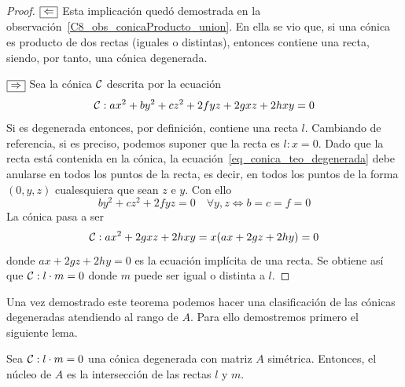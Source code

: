 \begin{proof}
	$\fbox{$\Leftarrow$}$ Esta implicación quedó demostrada en la observación~\ref{C8_obs_conicaProducto_union}. En ella se vio que, si una cónica es producto de dos rectas (iguales o distintas), entonces contiene una recta, siendo, por tanto, una cónica degenerada.
	
	$\fbox{$\Rightarrow$}$ Sea la cónica $\mathcal{C}$ descrita por la ecuación
	\begin{equation}\label{eq_conica_teo_degenerada}
	\mathcal{C}: ax^2+by^2+cz^2+2fyz+2gxz+2hxy=0
	\end{equation}
	Si es degenerada entonces, por definición, contiene una recta $l$. Cambiando de referencia, si es preciso, podemos suponer que la recta es $l:x=0$. Dado que la recta está contenida en la cónica, la ecuación~\eqref{eq_conica_teo_degenerada} debe anularse en todos los puntos de la recta, es decir, en todos los puntos de la forma $(0,y,z)$ cualesquiera que sean $z$ e $y$. Con ello
	\begin{equation}
	by^2+cz^2+2fyz=0 \quad \forall y,z \Leftrightarrow b=c=f=0
	\end{equation}
	La cónica pasa a ser
	\begin{equation}
	\mathcal{C}: ax^2+2gxz+2hxy=x(ax+2gz+2hy)=0
	\end{equation}
	donde $ax+2gz+2hy=0$ es la ecuación implícita de una recta. Se obtiene así que $\mathcal{C}:l\cdot m=0$ donde $m$ puede ser igual o distinta a $l$.
\end{proof}

Una vez demostrado este teorema podemos hacer una clasificación de las cónicas degeneradas atendiendo al rango de $A$. Para ello demostremos primero el siguiente lema.

\begin{lem}\label{C8_lem_nucleo_interseccion_rectas}
	Sea $\mathcal{C}:l\cdot m=0$ una cónica degenerada con matriz $A$ simétrica. Entonces, el núcleo de $A$ es la intersección de las rectas $l$ y $m$.
\end{lem}

